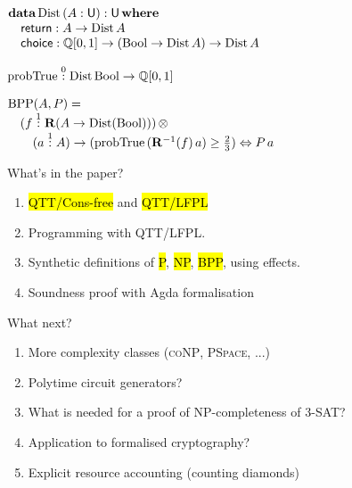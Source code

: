 \documentclass[xetex,aspectratio=169,14pt,hyperref={pdfpagelabels=true,pdflang={en-GB}}]{beamer}
\begin{document}
\begin{frame}
  $\begin{array}{@{}l}
    \textbf{data}\,\mathrm{Dist}\,(A : \mathsf{U}) : \mathsf{U}\,\textbf{where} \\
    \quad \mathsf{return} : A \to \mathrm{Dist}\,A \\
    \quad \mathsf{choice} : \mathbb{Q}[0,1] \to (\BoolTy \to \mathrm{Dist}\,A) \to \mathrm{Dist}\,A
  \end{array}$

  \bigskip
  \pause

  $\mathrm{probTrue} \stackrel0: \mathrm{Dist}\,\mathrm{Bool} \to \mathbb{Q}[0,1]$

  \bigskip
  \pause

  $\begin{array}[t]{@{}l}
      \mathrm{BPP}(A,P) = \\
      \quad (f \stackrel1: \mathbf{R}(A \to \mathrm{Dist}(\BoolTy))) \, \otimes \\
      \qquad (a \stackrel1: A) \to
      (\mathrm{probTrue}\,(\mathbf{R}^{-1}(f)\,a) \geq \frac{2}{3}) \Leftrightarrow P\,a
    \end{array}$

\end{frame}

\begin{frame}
\end{frame}

\begin{frame}
  \textcolor{TitleRed}{What's in the paper?}

  \begin{enumerate}
  \item \hl{QTT/Cons-free} and \hl{QTT/LFPL} 

  \item Programming with QTT/LFPL.

  \item Synthetic definitions of \hl{P}, \hl{NP}, \hl{BPP}, using effects.

  \item Soundness proof with Agda formalisation \\

  \end{enumerate}

  \bigskip

  \textcolor{TitleRed}{What next?}
  \begin{enumerate}
  \item More complexity classes (\textsc{coNP}, \textsc{PSpace}, ...)
  \item Polytime circuit generators?
  \item What is needed for a proof of NP-completeness of 3-SAT?
  \item Application to formalised cryptography?
  \item Explicit resource accounting (counting diamonds)
  \end{enumerate}
\end{frame}
\end{document}

